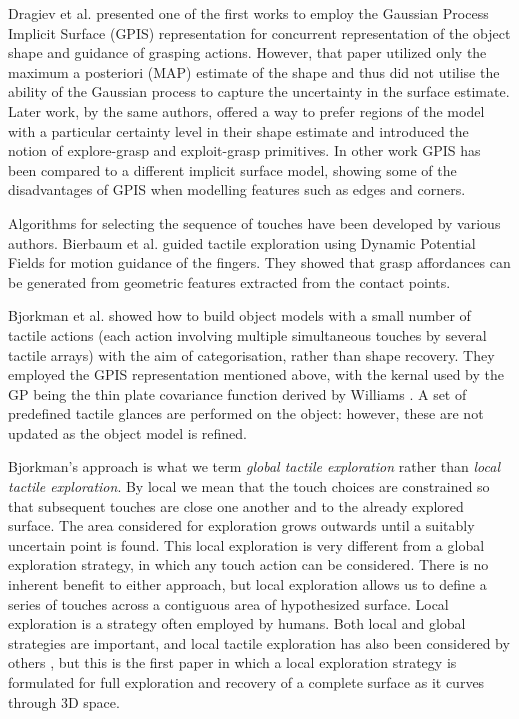 Dragiev et al. \cite{Dragiev2011Gaussian} presented one of the first works to employ the Gaussian Process Implicit Surface (GPIS) representation for concurrent representation of the object shape and guidance of grasping actions. However, that paper utilized only the maximum a posteriori (MAP) estimate of the shape and thus did not utilise the ability of the Gaussian process to capture the uncertainty in the surface estimate. Later work, by the same authors, \cite{Dragiev2013Uncertainty} offered a way to prefer regions of the model with a particular certainty level in their shape estimate and introduced the notion of explore-grasp and exploit-grasp primitives. In other work \cite{Ottenhaus16} GPIS has been compared to a different implicit surface model, showing some of the disadvantages of GPIS when modelling features such as edges and corners.

Algorithms for selecting the sequence of touches have been developed by various authors. Bierbaum et al. \cite{Bierbaum2008Potential} guided tactile exploration using Dynamic Potential Fields for motion guidance of the fingers. They showed that grasp affordances can be generated from geometric features extracted from the contact points.

Bjorkman et al. \cite{Bjorkman2013Enhancing} showed how to build object models with a small number of tactile actions (each action involving multiple simultaneous touches by several tactile arrays) with the aim of categorisation, rather than shape recovery. They employed the GPIS representation mentioned above, with the kernal used by the GP being the thin plate covariance function derived by Williams \cite{Williams2007Gaussian}. A set of predefined tactile glances are performed on the object: however, these are not updated as the object model is refined. 

Bjorkman's approach is what we term {\em global tactile exploration} rather than {\em local tactile exploration}. By local we mean that the touch choices are constrained so that subsequent touches are close one another and to the already explored surface. The area considered for exploration grows outwards until a suitably uncertain point is found. This local exploration is very different from a global exploration strategy, in which any touch action can be considered. There is no inherent benefit to either approach, but local exploration allows us to define a series of touches across a contiguous area of hypothesized surface. Local exploration is a strategy often employed by humans. Both local and global strategies are important, and local tactile exploration has also been considered by others \cite{matsubaru2016,martinez17}, but this is the first paper in which a local exploration strategy is formulated for full exploration and recovery of a complete surface as it curves through 3D space. 

